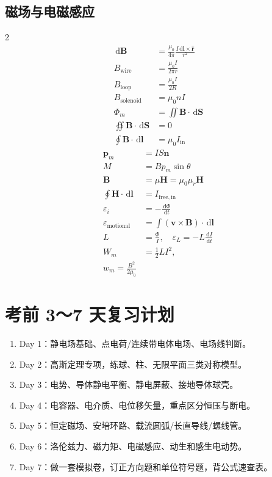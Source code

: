 \documentclass[UTF8,zihao=-4]{ctexart}
\newcommand{\dd}{\,\mathrm d}
\newcommand{\eps}{\varepsilon}
\newcommand{\muz}{\mu_0}
\newcommand{\mur}{\mu_r}
\newcommand{\ve}[1]{\bm{#1}}
\newcommand{\B}{\ve B}
\newcommand{\Hf}{\ve H}
\newcommand{\dl}{\dd\ve l}
\newcommand{\dS}{\dd\ve S}
\begin{document}
\subsection{磁场与电磁感应}
\begin{multicols}{2}
\begin{align*}
\dd\B&=\frac{\muz}{4\pi}\frac{I\dd\ve l\times\hat{\ve r}}{r^2}\\
B_{\mathrm{wire}}&=\frac{\muz I}{2\pi r}\\
B_{\mathrm{loop}}&=\frac{\muz I}{2R}\\
B_{\mathrm{solenoid}}&=\muz nI\\
\Phi_m&=\iint\B\cdot\dS\\
\oiint\B\cdot\dS&=0\\
\oint\B\cdot\dl&=\muz I_{\mathrm{in}}
\end{align*}
\columnbreak
\begin{align*}
\ve p_m&=IS\ve n\\
M&=Bp_m\sin\theta\\
\B&=\mu\Hf=\muz\mur\Hf\\
\oint\Hf\cdot\dl&=I_{\mathrm{free,in}}\\
\eps_i&=-\frac{\dd\Phi}{\dd t}\\
\eps_{\mathrm{motional}}&=\int(\ve v\times\B)\cdot\dl\\
L&=\frac{\Phi}{I},\quad \eps_L=-L\frac{\dd I}{\dd t}\\
W_m&=\frac12LI^2,\\ w_m=\frac{B^2}{2\muz}
\end{align*}
\end{multicols}


\section{考前 3～7 天复习计划}

\begin{methodbox}[7 天版]
\begin{enumerate}
  \item Day 1：静电场基础、点电荷/连续带电体电场、电场线判断。
  \item Day 2：高斯定理专项，练球、柱、无限平面三类对称模型。
  \item Day 3：电势、导体静电平衡、静电屏蔽、接地导体球壳。
  \item Day 4：电容器、电介质、电位移矢量，重点区分恒压与断电。
  \item Day 5：恒定磁场、安培环路、载流圆弧/长直导线/螺线管。
  \item Day 6：洛伦兹力、磁力矩、电磁感应、动生和感生电动势。
  \item Day 7：做一套模拟卷，订正方向题和单位符号题，背公式速查表。
\end{enumerate}
\end{methodbox}
\end{document}
